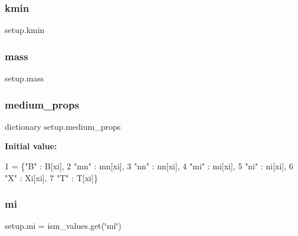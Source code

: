 \subsubsection{\texorpdfstring{kmin}{kmin}}
{\footnotesize\ttfamily setup.\+kmin}

\mbox{\label{namespacesetup_a121b84ea99c5c80a4b93c787d917ad6c}} 
\subsubsection{\texorpdfstring{mass}{mass}}
{\footnotesize\ttfamily setup.\+mass}

\mbox{\label{namespacesetup_ad24dff51841189965fb8f277f6e4dc92}} 
\subsubsection{\texorpdfstring{medium\+\_\+props}{medium\_props}}
{\footnotesize\ttfamily dictionary setup.\+medium\+\_\+props}

{\bfseries Initial value\+:}
\begin{DoxyCode}
1 =  \{\textcolor{stringliteral}{"B"}  : B[xi], 
2                             \textcolor{stringliteral}{"mn"} : mn[xi],
3                             \textcolor{stringliteral}{"nn"} : nn[xi],
4                             \textcolor{stringliteral}{"mi"} : mi[xi],
5                             \textcolor{stringliteral}{"ni"} : ni[xi],
6                             \textcolor{stringliteral}{"X"}  : Xi[xi],
7                             \textcolor{stringliteral}{"T"}  : T[xi]\}
\end{DoxyCode}
\mbox{\label{namespacesetup_a0cf8017743a319ca8fd9bdfb6904e7fd}} 
\subsubsection{\texorpdfstring{mi}{mi}}
{\footnotesize\ttfamily setup.\+mi = ism\+\_\+values.\+get(\char`\"{}mi\char`\"{})}

\mbox{\label{namespacesetup_ab6d825a594786f92a8bc65116ef2f721}} 
